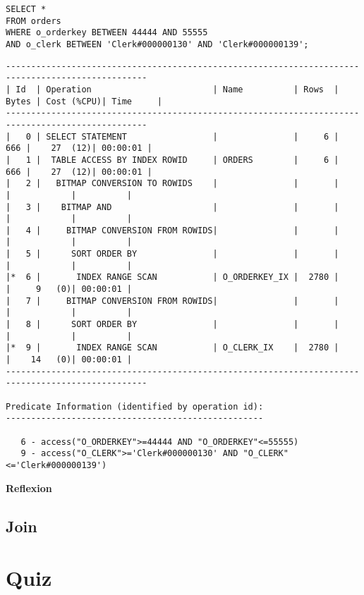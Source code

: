 \documentclass[10pt]{article}
\begin{document}
\begin{lstlisting}[style=sql]
SELECT *
FROM orders
WHERE o_orderkey BETWEEN 44444 AND 55555
AND o_clerk BETWEEN 'Clerk#000000130' AND 'Clerk#000000139';
\end{lstlisting}
\begin{lstlisting}[style=queryexecutionplanSmall]
--------------------------------------------------------------------------------------------------
| Id  | Operation                        | Name          | Rows  | Bytes | Cost (%CPU)| Time     |
--------------------------------------------------------------------------------------------------
|   0 | SELECT STATEMENT                 |               |     6 |   666 |    27  (12)| 00:00:01 |
|   1 |  TABLE ACCESS BY INDEX ROWID     | ORDERS        |     6 |   666 |    27  (12)| 00:00:01 |
|   2 |   BITMAP CONVERSION TO ROWIDS    |               |       |       |            |          |
|   3 |    BITMAP AND                    |               |       |       |            |          |
|   4 |     BITMAP CONVERSION FROM ROWIDS|               |       |       |            |          |
|   5 |      SORT ORDER BY               |               |       |       |            |          |
|*  6 |       INDEX RANGE SCAN           | O_ORDERKEY_IX |  2780 |       |     9   (0)| 00:00:01 |
|   7 |     BITMAP CONVERSION FROM ROWIDS|               |       |       |            |          |
|   8 |      SORT ORDER BY               |               |       |       |            |          |
|*  9 |       INDEX RANGE SCAN           | O_CLERK_IX    |  2780 |       |    14   (0)| 00:00:01 |
--------------------------------------------------------------------------------------------------
 
Predicate Information (identified by operation id):
---------------------------------------------------
 
   6 - access("O_ORDERKEY">=44444 AND "O_ORDERKEY"<=55555)
   9 - access("O_CLERK">='Clerk#000000130' AND "O_CLERK"<='Clerk#000000139')
\end{lstlisting}
\textbf{Reflexion} \newline


\subsection{Join}

\section{Quiz}
\end{document}
